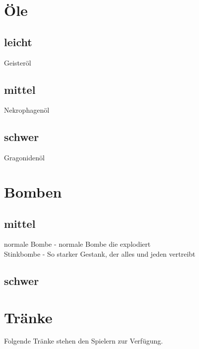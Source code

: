 \section{Öle}
\subsection{leicht}
Geisteröl \\
\subsection{mittel}
Nekrophagenöl \\
\subsection{schwer}
Gragonidenöl \\


\section{Bomben}
\subsection{mittel}
normale Bombe - normale Bombe die explodiert \\
Stinkbombe - So starker Gestank, der alles und jeden vertreibt \\

\subsection{schwer}




\section{Tränke}
Folgende Tränke stehen den Spielern zur Verfügung. 

